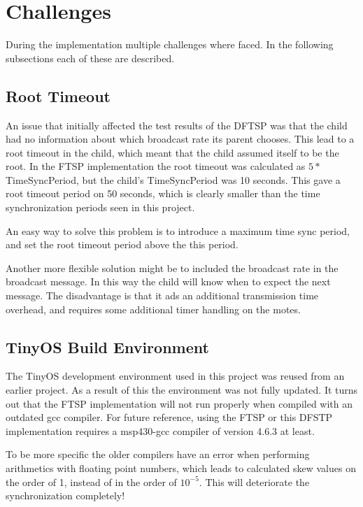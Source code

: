 \documentclass[Main]{subfiles}
\begin{document}
\section{Challenges} %
\label{sec:challenges}

	During the implementation multiple challenges where faced. In the following subsections each of these are described.

	\subsection{Root Timeout} %
	\label{sub:root_timeout}
		An issue that initially affected the test results of the DFTSP was that the child had no information about which broadcast rate its parent chooses. 
		This lead to a root timeout in the child, which meant that the child assumed itself to be the root. 
		In the FTSP implementation the root timeout was calculated as $5*$TimeSyncPeriod, but the child's TimeSyncPeriod was 10 seconds. This gave a root timeout period on 50 seconds, which is clearly smaller than the time synchronization periods seen in this project.

		An easy way to solve this problem is to introduce a maximum time sync period, and set the root timeout period above the this period.

		Another more flexible solution might be to included the broadcast rate in the broadcast message. 
		In this way the child will know when to expect the next message.
		The disadvantage is that it ads an additional transmission time overhead, and requires some additional timer handling on the motes.

	\subsection{TinyOS Build Environment} %
	\label{sub:tinyos_build_environment}
		The TinyOS development environment used in this project was reused from an earlier project. 
		As a result of this the environment was not fully updated.
		It turns out that the FTSP implementation will not run properly when compiled with an outdated gcc compiler.
		For future reference, using the FTSP or this DFSTP implementation requires a msp430-gcc compiler of version 4.6.3 at least.

		To be more specific the older compilers have an error when performing arithmetics with floating point numbers, which leads to calculated skew values on the order of 1, instead of in the order of $10^{-5}$.
		This will deteriorate the synchronization completely! 

\end{document}
